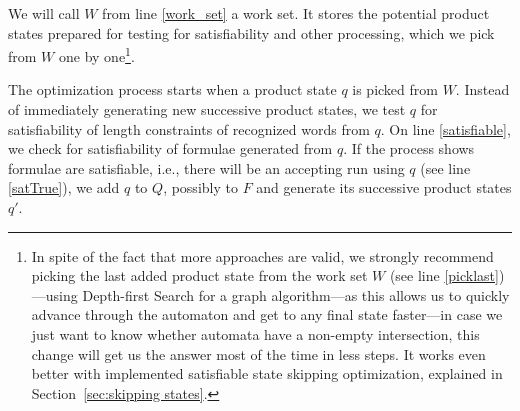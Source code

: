 We will call $W$ from line \ref{work_set} a work set. It stores the potential product states prepared for testing for satisfiability and other processing, which we pick from $W$ one by one\footnote{In spite of the fact that more approaches are valid, we strongly recommend picking the last added product state from the work set $W$ (see line \ref{picklast})---using Depth-first Search for a graph algorithm---as this allows us to quickly advance through the automaton and get to any final state faster---in case we just want to know whether automata have a non-empty intersection, this change will get us the answer most of the time in less steps. It works even better with implemented satisfiable state skipping optimization, explained in Section~\ref{sec:skipping states}.}.

The optimization process starts when a product state $q$ is picked from $W$. Instead of immediately generating new successive product states, we test $q$ for satisfiability of length constraints of recognized words from $q$. On line \ref{satisfiable}, we check for satisfiability of formulae generated from $q$. If the process shows formulae are satisfiable, i.e., there will be an accepting run using $q$ (see line \ref{satTrue}), we add $q$ to $Q$, possibly to $F$ and generate its successive product states $q'$.

